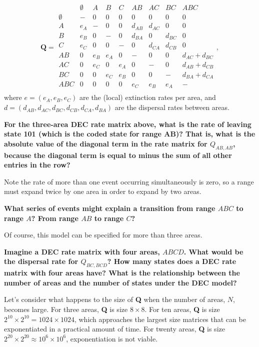 \[
\textbf{Q} = 
	\begin{array}{c|cccccccc}
		& \emptyset & A & B & C & AB & AC & BC & ABC \\
		\hline
		\emptyset & - & 0 & 0 & 0 & 0 & 0 & 0 & 0 \\
		A & e_A & - & 0 & 0 & d_{AB} & d_{AC} & 0 & 0 \\
		B & e_B & 0 & - & 0 & d_{BA} & 0 & d_{BC} & 0 \\
		C & e_C & 0 & 0 & - & 0 & d_{CA} & d_{CB} & 0 \\
		AB & 0 & e_B & e_A & 0 & - & 0 & 0 & d_{AC} + d_{BC} \\
		AC & 0 & e_C & 0 & e_A & 0 & - & 0 & d_{AB} + d_{CB} \\
		BC & 0 & 0 & e_C & e_B & 0 & 0 & - & d_{BA} + d_{CA} \\
		ABC & 0 & 0 & 0 & 0 & e_C & e_B & e_A & - \\								
	\end{array},
\]
where $e = ( e_A, e_B, e_C )$ are the (local) extinction rates per area, and $d = ( d_{AB}, d_{AC}, d_{BC}, d_{CB}, d_{CA}, d_{BA})$ are the dispersal rates between areas.

{\bf {} For the three-area DEC rate matrix above, what is the rate of leaving state 101 (which is the coded state for range AB)? That is, what is the absolute value of the diagonal term in the rate matrix for $Q_{AB,AB}$, because the diagonal term is equal to minus the sum of all other entries in the row? }

Note the rate of more than one event occurring simultaneously is zero, so a range must expand twice by one area in order to expand by two areas.

{\bf {} What series of events might explain a transition from range $ABC$ to range $A$? From range $AB$ to range $C$?}

Of course, this model can be specified for more than three areas.

{ \bf {} Imagine a DEC rate matrix with four areas, $ABCD$. What would be the dispersal rate for $Q_{BC,BCD}$? How many states does a DEC rate matrix with four areas have? What is the relationship between the number of areas and the number of states under the DEC model? }

Let's consider what happens to the size of \textbf{Q} when the number of areas, $N$, becomes large.
For three areas, \textbf{Q} is size $8 \times 8$.
For ten areas, \textbf{Q} is size $2^{10} \times 2^{10} = 1024 \times 1024$, which approaches the largest size matrices that can be exponentiated in a practical amount of time.
For twenty areas, \textbf{Q} is size $2^{20} \times 2^{20} \approx 10^6 \times 10^6$, exponentiation is not viable.


